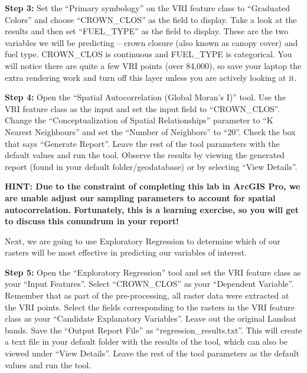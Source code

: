 \documentclass[
]{book}
\begin{document}
\textbf{Step 3:} Set the ``Primary symbology'' on the VRI feature class to ``Graduated Colors'' and choose ``CROWN\_CLOS'' as the field to display. Take a look at the results and then set ``FUEL\_TYPE'' as the field to display. These are the two variables we will be predicting -- crown closure (also known as canopy cover) and fuel type. CROWN\_CLOS is continuous and FUEL\_TYPE is categorical. You will notice there are quite a few VRI points (over 84,000), so save your laptop the extra rendering work and turn off this layer unless you are actively looking at it.

\textbf{Step 4:} Open the ``Spatial Autocorrelation (Global Moran's I)'' tool. Use the VRI feature class as the input and set the input field to ``CROWN\_CLOS''. Change the ``Conceptualization of Spatial Relationships'' parameter to ``K Nearest Neighbours'' and set the ``Number of Neighbors'' to ``20''. Check the box that says ``Generate Report''. Leave the rest of the tool parameters with the default values and run the tool. Observe the results by viewing the generated report (found in your default folder/geodatabase) or by selecting ``View Details''.

\textbf{HINT: Due to the constraint of completing this lab in ArcGIS Pro, we are unable adjust our sampling parameters to account for spatial autocorrelation. Fortunately, this is a learning exercise, so you will get to discuss this conundrum in your report!}

Next, we are going to use Exploratory Regression to determine which of our rasters will be most effective in predicting our variables of interest.

\textbf{Step 5:} Open the ``Exploratory Regression'' tool and set the VRI feature class as your ``Input Features''. Select ``CROWN\_CLOS'' as your ``Dependent Variable''. Remember that as part of the pre-processing, all raster data were extracted at the VRI points. Select the fields corresponding to the rasters in the VRI feature class as your ``Candidate Explanatory Variables''. Leave out the original Landsat bands. Save the ``Output Report File'' as ``regression\_results.txt''. This will create a text file in your default folder with the results of the tool, which can also be viewed under ``View Details''. Leave the rest of the tool parameters as the default values and run the tool.
\end{document}
